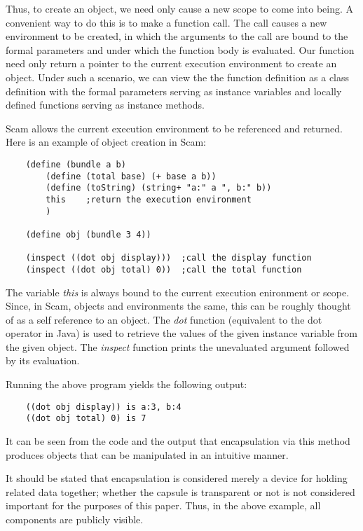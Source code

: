 Thus, to create an object, we need only cause a new scope to come into
being. A convenient way to do this is to make a function call. The call
causes a new environment to be created, in which the arguments to the
call are bound to the formal parameters and under which the function body
is evaluated. Our function need only return a pointer to the current
execution environment to create an object.  Under such a scenario, we
can view the the function definition as a class definition with the
formal parameters serving as instance variables and locally defined
functions serving as instance methods.  

Scam 
allows the current execution environment
to be referenced and returned.
Here is an example of object creation in Scam:

\begin{verbatim}
    (define (bundle a b)
        (define (total base) (+ base a b))
        (define (toString) (string+ "a:" a ", b:" b))
        this    ;return the execution environment
        )

    (define obj (bundle 3 4))

    (inspect ((dot obj display)))  ;call the display function
    (inspect ((dot obj total) 0))  ;call the total function
\end{verbatim}

The variable {\it this} is always bound to the current execution
enironment or scope. Since, in Scam, objects and environments the same,
this can be roughly thought of as a self reference to an object. The
{\it dot} function (equivalent to the dot operator in Java) is used to
retrieve the values of the given instance variable from the given object.
The {\it inspect} function prints the unevaluated argument followed by
its evaluation.

Running the above program yields the following output:

\begin{verbatim}
    ((dot obj display)) is a:3, b:4
    ((dot obj total) 0) is 7
\end{verbatim}

It can be seen from the code and the output that encapsulation via this
method produces objects that can be manipulated in an intuitive manner.

It should be stated that encapsulation is considered merely a device for
holding related data together; whether the capsule is transparent or
not is not considered important for the purposes of this paper. Thus,
in the above example, all components are publicly visible. 

